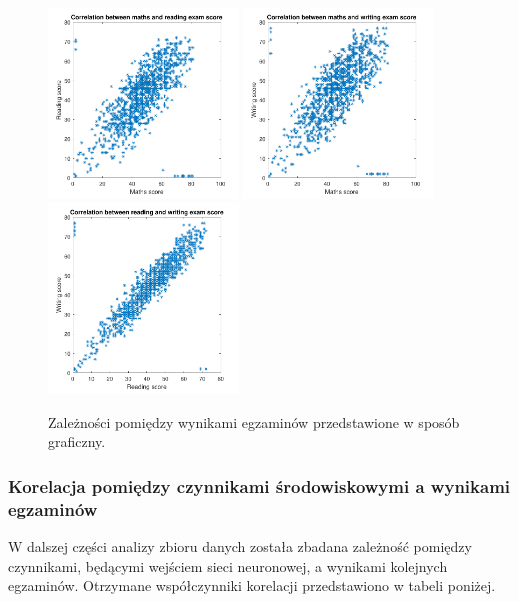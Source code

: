 \documentclass[12pt]{article}
\begin{document}
\begin{figure}[H]
\centering
\includegraphics[width=0.45\textwidth]{korelacja_egzamin12.pdf}
\includegraphics[width=0.45\textwidth]{korelacja_egzamin13.pdf}
\includegraphics[width=0.45\textwidth]{korelacja_egzamin23.pdf}
\caption{Zależności pomiędzy wynikami egzaminów przedstawione w sposób graficzny.}
\end{figure}

\subsubsection {Korelacja pomiędzy czynnikami środowiskowymi a wynikami egzaminów}
W dalszej części analizy zbioru danych została zbadana zależność pomiędzy czynnikami, będącymi wejściem sieci neuronowej, a wynikami kolejnych egzaminów. Otrzymane współczynniki korelacji przedstawiono w tabeli poniżej.
\end{document}
